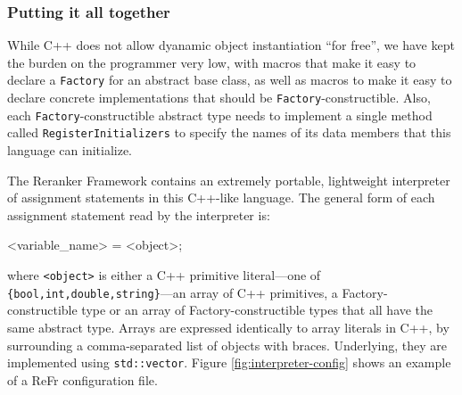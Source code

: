 \documentclass[a4paper]{article}
\newcommand\inlinecode[1]{\scriptsize\texttt{#1}\normalsize}
\newenvironment{lyxcode}
{\par\begin{list}{}{
\scriptsize
\setlength{\leftmargin}{0.1in}
\setlength{\rightmargin}{\leftmargin}
\setlength{\listparindent}{0pt}%
\raggedright
\setlength{\itemsep}{0pt}
\setlength{\parsep}{0pt}
\normalfont\ttfamily}%
 \item[]}
{\end{list}}
\begin{document}



\subsubsection{Putting it all together}

While C++ does not allow dyanamic object instantiation ``for free'',
we have kept the burden on the programmer very low, with macros that
make it easy to declare a \texttt{Factory} for an abstract base class,
as well as macros to make it easy to declare concrete implementations
that should be \texttt{Factory}-constructible.  Also, each
\texttt{Factory}-constructible abstract type needs to implement a
single method called \texttt{RegisterInitializers} to specify the
names of its data members that this language can initialize.


The Reranker Framework contains an extremely portable, lightweight
interpreter of assignment statements in this C++-like language.  The
general form of each assignment statement read by the interpreter is:
\begin{lyxcode}
<variable\_name> = <object>;
\end{lyxcode}
\normalsize
where \inlinecode{<object>} is either a C++ primitive literal---one of
\inlinecode{\{bool,int,double,string\}}---an array of C++ primitives, a
Factory-constructible type or an array of Factory-constructible types
that all have the same abstract type.  Arrays are expressed identically to array literals in C++, by surrounding a comma-separated list of objects with braces.  Underlying, they are implemented using \inlinecode{std::vector}. Figure \ref{fig:interpreter-config} shows an example of a ReFr configuration file.
\end{document}

